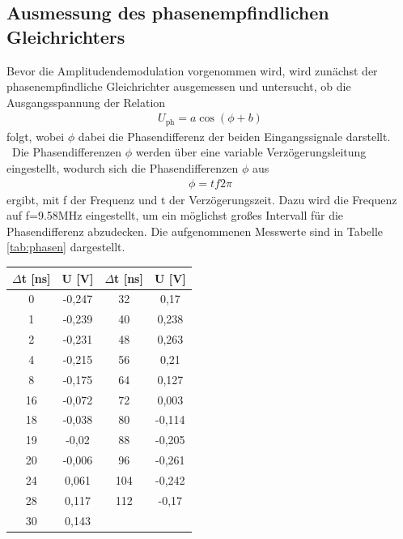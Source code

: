 \documentclass[]{scrartcl}
\begin{document}
\subsection{Ausmessung des phasenempfindlichen Gleichrichters}
Bevor die Amplitudendemodulation vorgenommen wird, wird zunächst der phasenempfindliche Gleichrichter ausgemessen und untersucht, ob die Ausgangsspannung der Relation
\begin{align}
U_{\text{ph}}=a\cos(\phi+b)
\label{eq:phasen}
\end{align}
folgt, wobei $\phi$ dabei die Phasendifferenz der beiden Eingangssignale darstellt. \\\
Die Phasendifferenzen $\phi$ werden über eine variable Verzögerungsleitung eingestellt, wodurch sich die Phasendifferenzen $\phi$ aus 
\begin{align}
\phi = tf2\pi
\end{align}
ergibt, mit f der Frequenz und t der Verzögerungszeit. Dazu wird die Frequenz auf f=9.58\si{MHz} eingestellt, um ein möglichst großes Intervall für die Phasendifferenz abzudecken. Die aufgenommenen Messwerte sind in Tabelle \ref{tab:phasen} dargestellt. \\
\begin{center}
	\begin{tabular}{|c|c||c|c|}
		\hline $\Delta$t [ns] & U [V] & $\Delta$t [ns] & U [V]\\
		\hline	0	&	-0,247	&	32	&	0,17	\\
		\hline	1	&	-0,239	&	40	&	0,238	\\
		\hline	2	&	-0,231	&	48	&	0,263	\\
		\hline	4	&	-0,215	&	56	&	0,21	\\
		\hline	8	&	-0,175	&	64	&	0,127	\\
		\hline	16	&	-0,072	&	72	&	0,003	\\
		\hline	18	&	-0,038	&	80	&	-0,114	\\
		\hline	19	&	-0,02	&	88	&	-0,205	\\
		\hline	20	&	-0,006	&	96	&	-0,261	\\
		\hline	24	&	0,061	&	104	&	-0,242	\\
		\hline	28	&	0,117	&	112	&	-0,17	\\
		\hline	30	&	0,143	&		&	\\	
		\hline
	\end{tabular}
	\label{tab:phasen}
\end{center}
\end{document}
